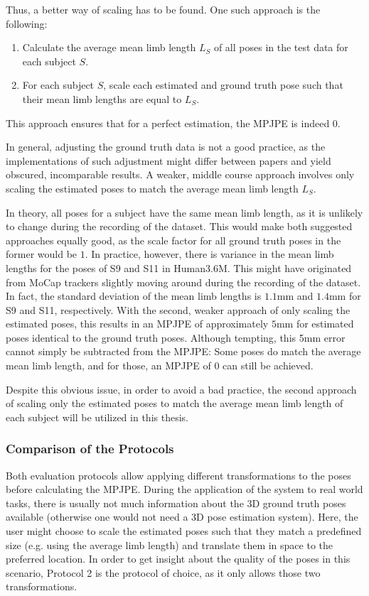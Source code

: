 Thus, a better way of scaling has to be found.
One such approach is the following:
\begin{enumerate}[label={\arabic*.}]
	\item Calculate the average mean limb length $L_S$ of all poses in the test data for each subject $S$.
	\item For each subject $S$, scale each estimated and ground truth pose such that their mean limb lengths are equal to $L_S$.
\end{enumerate}
This approach ensures that for a perfect estimation, the MPJPE is indeed 0.

In general, adjusting the ground truth data is not a good practice, as the implementations of such adjustment might differ between papers and yield obscured, incomparable results.
A weaker, middle course approach involves only scaling the estimated poses to match the average mean limb length $L_S$.

In theory, all poses for a subject have the same mean limb length, as it is unlikely to change during the recording of the dataset.
This would make both suggested approaches equally good, as the scale factor for all ground truth poses in the former would be $1$.
In practice, however, there is variance in the mean limb lengths for the poses of S9 and S11 in Human3.6M.
This might have originated from MoCap trackers slightly moving around during the recording of the dataset.
In fact, the standard deviation of the mean limb lengths is $1.1$mm and $1.4$mm for S9 and S11, respectively.
With the second, weaker approach of only scaling the estimated poses, this results in an MPJPE of approximately $5$mm for estimated poses identical to the ground truth poses.
Although tempting, this 5mm error cannot simply be subtracted from the MPJPE:
Some poses do match the average mean limb length, and for those, an MPJPE of $0$ can still be achieved.

Despite this obvious issue, in order to avoid a bad practice, the second approach of scaling only the estimated poses to match the average mean limb length of each subject will be utilized in this thesis.

\subsubsection{Comparison of the Protocols}

Both evaluation protocols allow applying different transformations to the poses before calculating the MPJPE.
During the application of the system to real world tasks, there is usually not much information about the 3D ground truth poses available (otherwise one would not need a 3D pose estimation system).
Here, the user might choose to scale the estimated poses such that they match a predefined size (e.g. using the average limb length) and translate them in space to the preferred location.
In order to get insight about the quality of the poses in this scenario, Protocol 2 is the protocol of choice, as it only allows those two transformations.

